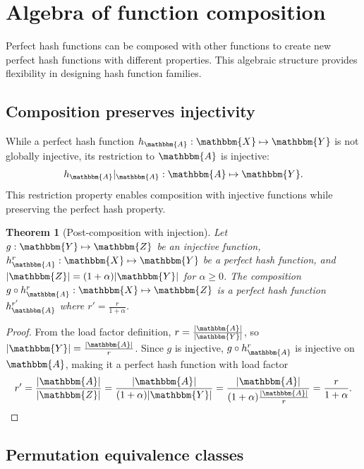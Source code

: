 \documentclass[hidelinks,11pt,final]{article}
\newcommand{\envnumstyle}{section}
\theoremstyle{plain}
\newtheorem{theorem}{Theorem}[\envnumstyle]
\begin{document}
\section{Algebra of function composition}

Perfect hash functions can be composed with other functions to create new perfect hash functions with different properties. This algebraic structure provides flexibility in designing hash function families.

\subsection{Composition preserves injectivity}

While a perfect hash function $h_\mathbbm{A} : \mathbbm{X} \mapsto \mathbbm{Y}$ is not globally injective, its restriction to $\mathbbm{A}$ is injective:
\begin{equation}
	h_\mathbbm{A}|_{\mathbbm{A}} : \mathbbm{A} \mapsto \mathbbm{Y}.
\end{equation}
This restriction property enables composition with injective functions while preserving the perfect hash property.

\begin{theorem}[Post-composition with injection]
Let $g : \mathbbm{Y} \mapsto \mathbbm{Z}$ be an injective function, $h_\mathbbm{A}^r : \mathbbm{X} \mapsto \mathbbm{Y}$ be a perfect hash function, and $|\mathbbm{Z}| = (1 + \alpha) |\mathbbm{Y}|$ for $\alpha \geq 0$.
The composition $g \circ h_\mathbbm{A}^r : \mathbbm{X} \mapsto \mathbbm{Z}$ is a perfect hash function $h_\mathbbm{A}^{r'}$ where $r' = \frac{r}{1+\alpha}$.
\end{theorem}
\begin{proof}
From the load factor definition, $r = \frac{|\mathbbm{A}|}{|\mathbbm{Y}|}$, so $|\mathbbm{Y}| = \frac{|\mathbbm{A}|}{r}$.
Since $g$ is injective, $g \circ h_\mathbbm{A}^r$ is injective on $\mathbbm{A}$, making it a perfect hash function with load factor
\begin{equation}
	r' = \frac{|\mathbbm{A}|}{|\mathbbm{Z}|} = \frac{|\mathbbm{A}|}{(1+\alpha)|\mathbbm{Y}|} = \frac{|\mathbbm{A}|}{(1+\alpha)\frac{|\mathbbm{A}|}{r}} = \frac{r}{1+\alpha}.
\end{equation}
\end{proof}

\subsection{Permutation equivalence classes}
\end{document}
